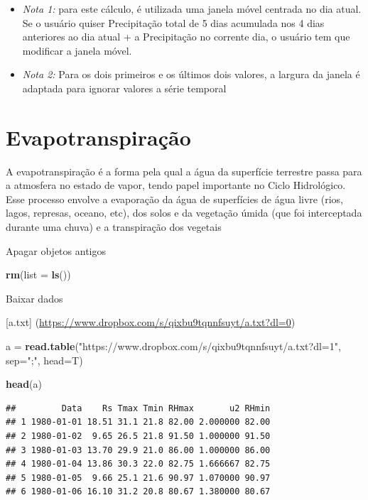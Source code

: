 \documentclass[
]{book}
\newenvironment{Shaded}{\begin{snugshade}}{\end{snugshade}}
\newcommand{\DataTypeTok}[1]{\textcolor[rgb]{0.13,0.29,0.53}{#1}}
\newcommand{\KeywordTok}[1]{\textcolor[rgb]{0.13,0.29,0.53}{\textbf{#1}}}
\newcommand{\NormalTok}[1]{#1}
\newcommand{\StringTok}[1]{\textcolor[rgb]{0.31,0.60,0.02}{#1}}
\begin{document}
\begin{itemize}
\item
  \emph{Nota 1:} para este cálculo, é utilizada uma janela móvel centrada no dia atual. Se o usuário quiser Precipitação total de 5 dias acumulada nos 4 dias anteriores ao dia atual + a Precipitação no corrente dia, o usuário tem que modificar a janela móvel.
\item
  \emph{Nota 2:} Para os dois primeiros e os últimos dois valores, a largura da janela é adaptada para ignorar valores a série temporal
\end{itemize}

\hypertarget{evapotranspirauxe7uxe3o}{%
\section{Evapotranspiração}\label{evapotranspirauxe7uxe3o}}

A evapotranspiração é a forma pela qual a água da superfície terrestre passa para a atmosfera no estado de vapor, tendo papel importante no Ciclo Hidrológico. Esse processo envolve a evaporação da água de superfícies de água livre (rios, lagos, represas, oceano, etc), dos solos e da vegetação úmida (que foi interceptada durante uma chuva) e a transpiração dos vegetais

Apagar objetos antigos

\begin{Shaded}
\begin{Highlighting}[]
 \KeywordTok{rm}\NormalTok{(}\DataTypeTok{list =} \KeywordTok{ls}\NormalTok{())}
\end{Highlighting}
\end{Shaded}

Baixar dados

{[}a.txt{]} (\url{https://www.dropbox.com/s/qixbu9tqnnfsuyt/a.txt?dl=0})

\begin{Shaded}
\begin{Highlighting}[]
\NormalTok{ a =}\StringTok{ }\KeywordTok{read.table}\NormalTok{(}\StringTok{"https://www.dropbox.com/s/qixbu9tqnnfsuyt/a.txt?dl=1"}\NormalTok{, }\DataTypeTok{sep=}\StringTok{";"}\NormalTok{, }\DataTypeTok{head=}\NormalTok{T)}
  
\KeywordTok{head}\NormalTok{(a)}
\end{Highlighting}
\end{Shaded}

\begin{verbatim}
##         Data    Rs Tmax Tmin RHmax       u2 RHmin
## 1 1980-01-01 18.51 31.1 21.8 82.00 2.000000 82.00
## 2 1980-01-02  9.65 26.5 21.8 91.50 1.000000 91.50
## 3 1980-01-03 13.70 29.9 21.0 86.00 1.000000 86.00
## 4 1980-01-04 13.86 30.3 22.0 82.75 1.666667 82.75
## 5 1980-01-05  9.66 25.1 21.6 90.97 1.070000 90.97
## 6 1980-01-06 16.10 31.2 20.8 80.67 1.380000 80.67
\end{verbatim}
\end{document}
